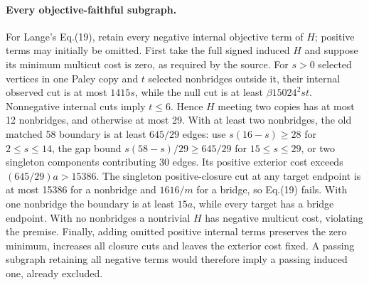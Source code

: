 \documentclass[sigconf,anonymous,review]{acmart}
\newcommand{\1}{\mathbf{1}}
\begin{document}
\paragraph{Every objective-faithful subgraph.}
For Lange's Eq.(19), retain every negative internal objective term
of $H$; positive terms may initially be omitted.
First take the full signed induced $H$ and suppose its minimum
multicut cost is zero, as required by the source.
For $s>0$ selected vertices in one Paley copy and $t$ selected
nonbridges outside it, their internal observed cut is at most $1415s$,
while the null cut is at least $\beta15024^2st$.
Nonnegative internal cuts imply $t\le6$.
Hence $H$ meeting two copies has at most 12 nonbridges, and otherwise
at most 29. With at least two nonbridges, the old matched 58 boundary
is at least $645/29$ edges: use $s(16-s)\ge28$ for $2\le s\le14$,
the gap bound $s(58-s)/29\ge645/29$ for $15\le s\le29$,
or two singleton components contributing 30 edges.
Its positive exterior cost exceeds $(645/29)a>15386$.
The singleton positive-closure cut at any target endpoint is at most
15386 for a nonbridge and $1616/m$ for a bridge, so Eq.(19) fails.
With one nonbridge the boundary is at least $15a$, while every
target has a bridge endpoint. With no nonbridges a nontrivial $H$
has negative multicut cost, violating the premise.
Finally, adding omitted positive internal terms preserves the zero
minimum, increases all closure cuts and leaves the exterior cost fixed.
A passing subgraph retaining all negative terms would therefore imply
a passing induced one, already excluded.
\end{document}
